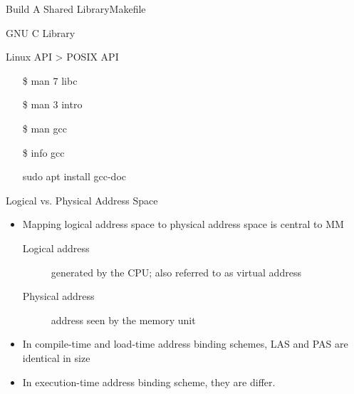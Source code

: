 \begin{frame}{Build A Shared Library}{Makefile}
  \centering
\end{frame}

\begin{frame}{GNU C Library}
  \begin{minipage}{.55\linewidth}
    Linux API > POSIX API
    \ttfamily
    \begin{itemize}
    \item[\$] man 7 libc
    \item[\$] man 3 intro
    \item[\$] man gcc
    \item[\$] info gcc
    \item[\debian] sudo apt install gcc-doc
    \end{itemize}
  \end{minipage}
  \begin{minipage}{.4\linewidth}
    \begin{center}
    \end{center}
  \end{minipage}
\end{frame}

\begin{frame}{Logical vs. Physical Address Space}
  \begin{itemize}
  \item Mapping logical address space to physical address space is central to MM
    \begin{description}
    \item[Logical address] generated by the CPU; also referred to as \alert{virtual
        address}
    \item[Physical address] address seen by the memory unit
    \end{description}
  \item In compile-time and load-time address binding schemes, LAS and PAS are identical
    in size
  \item In execution-time address binding scheme, they are differ.
  \end{itemize}
\end{frame}

